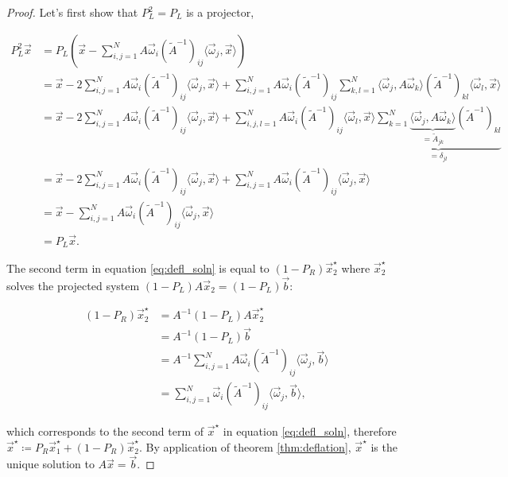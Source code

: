\documentclass{article}
\theoremstyle{plain} %
\theoremstyle{convention} %
\theoremstyle{remark} %
\numberwithin{equation}{section}
\begin{document}
\begin{proof}

Let's first show that $P_L^2 = P_L$ is a projector,

\begin{align*}
    P_L^2 \vec{x} &= P_L \left( \vec{x} - \sum_{i,j=1}^N A \vec{\omega}_i (\widetilde{A}^{-1})_{ij} \langle \vec{\omega}_j, \vec{x} \rangle \right) \\
    &= \vec{x} - 2 \sum_{i,j=1}^N A \vec{\omega}_i (\widetilde{A}^{-1})_{ij} \langle \vec{\omega}_j, \vec{x} \rangle + \sum_{i,j=1}^N A \vec{\omega}_i (\widetilde{A}^{-1})_{ij} \sum_{k,l=1}^N \langle \vec{\omega}_j, A \vec{\omega}_k \rangle (\widetilde{A}^{-1})_{kl} \langle \vec{\omega}_l, \vec{x} \rangle \\
    &= \vec{x} - 2 \sum_{i,j=1}^N A \vec{\omega}_i (\widetilde{A}^{-1})_{ij} \langle \vec{\omega}_j, \vec{x} \rangle + \sum_{i,j,l=1}^N A \vec{\omega}_i (\widetilde{A}^{-1})_{ij} \langle \vec{\omega}_l, \vec{x} \rangle \underbrace{\sum_{k=1}^N \underbrace{\langle \vec{\omega}_j, A \vec{\omega}_k \rangle}_{= \widetilde{A}_{jk}} (\widetilde{A}^{-1})_{kl} }_{= \delta_{jl}} \\
    &= \vec{x} - 2 \sum_{i,j=1}^N A \vec{\omega}_i (\widetilde{A}^{-1})_{ij} \langle \vec{\omega}_j, \vec{x} \rangle + \sum_{i,j=1}^N A \vec{\omega}_i (\widetilde{A}^{-1})_{ij} \langle \vec{\omega}_j, \vec{x} \rangle \\
    &= \vec{x} - \sum_{i,j=1}^N A \vec{\omega}_i (\widetilde{A}^{-1})_{ij} \langle \vec{\omega}_j, \vec{x} \rangle \\
    &= P_L \vec{x}.
\end{align*}

The second term in equation \eqref{eq:defl_soln} is equal to $(1-P_R)\vec{x}^{\star}_2$ where $\vec{x}^{\star}_2$ solves the projected system $(1-P_L)A \vec{x}_2 = (1-P_L) \vec{b}$:

\begin{align*}
    (1-P_R)\vec{x}^{\star}_2 &= A^{-1} (1-P_L) A \vec{x}^{\star}_2 \\
    &= A^{-1} (1-P_L) \vec{b} \\
    &= A^{-1} \sum_{i,j=1}^N A \vec{\omega}_i (\widetilde{A}^{-1})_{ij} \langle \vec{\omega}_j, \vec{b} \rangle \\
    &= \sum_{i,j=1}^N \vec{\omega}_i (\widetilde{A}^{-1})_{ij} \langle \vec{\omega}_j, \vec{b} \rangle,
\end{align*}

which corresponds to the second term of $\vec{x}^{\star}$ in equation \eqref{eq:defl_soln}, therefore $\vec{x}^{\star} \coloneqq P_R \vec{x}^{\star}_1 + (1-P_R) \vec{x}^{\star}_2$. By application of theorem \ref{thm:deflation}, $\vec{x}^{\star}$ is the unique solution to $A\vec{x} = \vec{b}$.

\end{proof}
\end{document}
